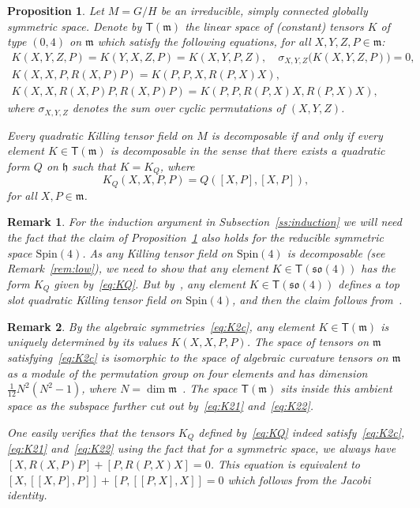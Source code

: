 \documentclass[10pt,a4paper]{amsart}
\newcommand \Spin{\mathrm{Spin}}
\newcommand \sT{\mathsf{T}}
\newcommand\h{\mathfrak h}
\newcommand\m{\mathfrak m}
\newcommand \so{\mathfrak{so}}
\newcommand \<{\langle}
\renewcommand \>{\rangle}
\newtheorem{proposition}{Proposition}
\newtheorem{remark}{Remark}
\begin{document}
	\begin{proposition} \label{p:topslot2}
		Let $M= G/H$ be an irreducible, simply connected globally symmetric space. Denote by $\sT(\m)$ the linear space of (constant) tensors $K$ of type $(0,4)$ on $\m$ which satisfy the following equations, for all $X, Y, Z, P \in \m$:
		\begin{gather}
			K(X,Y,Z,P) = K(Y,X,Z,P) = K(X,Y,P,Z), \quad \sigma_{X,Y,Z} \big(K(X,Y,Z,P)\big)=0, \label{eq:K2c}\\
			K(X,X,P,R(X,P)P)=K(P,P,X,R(P,X)X), \label{eq:K21}\\
			K(X,X,R(X,P)P,R(X,P)P)=K(P,P,R(P,X)X,R(P,X)X), \label{eq:K22}
		\end{gather}
		where $\sigma_{X,Y,Z}$ denotes the sum over cyclic permutations of $(X,Y,Z)$.
		
		Every quadratic Killing tensor field on $M$ is decomposable if and only if every element $K \in \sT(\m)$ is decomposable in the sense that there exists a quadratic form $Q$ on $\h$ such that $K=K_Q$, where
		\begin{equation} \label{eq:KQ}
			K_Q(X,X,P,P) = Q([X,P],[X,P]),
		\end{equation}
		for all $X, P \in \m$.
	\end{proposition}
    \begin{remark} \label{rem:Spin4}
      For the induction argument in Subsection~\ref{ss:induction} we will need the fact that the claim of Proposition~\ref{p:topslot2} also holds for the \emph{reducible} symmetric space $\Spin(4)$. As any Killing tensor field on $\Spin(4)$ is decomposable (see Remark~\ref{rem:low}), we need to show that any element $K \in \sT(\so(4))$ has the form $K_Q$ given by~\eqref{eq:KQ}. But by~\cite[Proposition~2]{MN2}, any element $K \in \sT(\so(4))$ defines a top slot quadratic Killing tensor field on $\Spin(4)$, and then the claim follows from~\cite[Remark~3]{MN2}.
    \end{remark}
	\begin{remark} \label{rem:dim}
		By the algebraic symmetries~\eqref{eq:K2c}, any element $K \in \sT(\m)$ is uniquely determined by its values $K(X,X,P,P)$. The space of tensors on $\m$ satisfying~\eqref{eq:K2c} is isomorphic to the space of algebraic curvature tensors on $\m$ as a module of the permutation group on four elements and has dimension $\frac{1}{12} N^2(N^2-1)$, where $N = \dim \m$~\cite[Remark~3]{MN2}. The space $\sT(\m)$ sits inside this ambient space as the subspace further cut out by~\eqref{eq:K21} and~\eqref{eq:K22}.
		
		One easily verifies that the tensors $K_Q$ defined by~\eqref{eq:KQ} indeed satisfy~\eqref{eq:K2c}, \eqref{eq:K21} and~\eqref{eq:K22} using the fact that for a symmetric space, we always have $[X,R(X,P)P]+[P,R(P,X)X]=0$. This equation is equivalent to $[X,[[X,P],P]]+[P,[[P,X],X]]=0$ which follows from the Jacobi identity.
	\end{remark}
	
\end{document}
